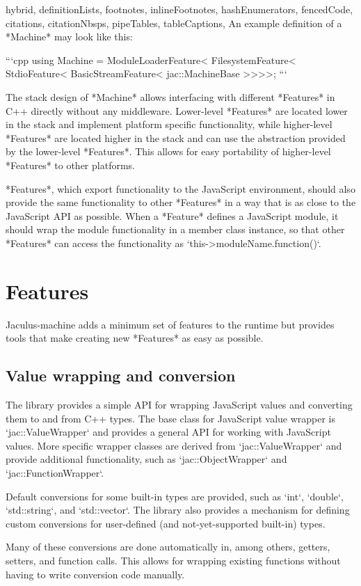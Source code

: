 \documentclass[
  digital,
  oneside,
  nosansbold,
  nocolorbold,
  lof,
  lot
]{fithesis4}
\begin{document}
\begin{markdown*}{%
  hybrid,
  definitionLists,
  footnotes,
  inlineFootnotes,
  hashEnumerators,
  fencedCode,
  citations,
  citationNbsps,
  pipeTables,
  tableCaptions,
}
An example definition of a *Machine* may look like this:

```cpp
using Machine =
    ModuleLoaderFeature<
    FilesystemFeature<
    StdioFeature<
    BasicStreamFeature<
    jac::MachineBase
>>>>;
```

The stack design of *Machine* allows interfacing with different *Features* in C++ directly without any middleware. Lower-level *Features* are located lower in the stack and implement platform specific functionality, while higher-level *Features* are located higher in the stack and can use the abstraction provided by the lower-level *Features*. This allows for easy portability of higher-level *Features* to other platforms.

*Features*, which export functionality to the JavaScript environment, should also provide the same functionality to other *Features* in a way that is as close to the JavaScript API as possible. When a *Feature* defines a JavaScript module, it should wrap the module functionality in a member class instance, so that other *Features* can access the functionality as `this->moduleName.function()`.


\section{Features}

Jaculus-machine adds a minimum set of features to the runtime but provides tools that make creating new *Features* as easy as possible.

\subsection{Value wrapping and conversion}

The library provides a simple API for wrapping JavaScript values and converting them to and from C++ types. The base class for JavaScript value wrapper is `jac::ValueWrapper` and provides a general API for working with JavaScript values. More specific wrapper classes are derived from `jac::ValueWrapper` and provide additional functionality, such as `jac::ObjectWrapper` and `jac::FunctionWrapper`.

Default conversions for some built-in types are provided, such as `int`, `double`, `std::string`, and `std::vector`. The library also provides a mechanism for defining custom conversions for user-defined (and not-yet-supported built-in) types.

Many of these conversions are done automatically in, among others, getters, setters, and function calls. This allows for wrapping existing functions without having to write conversion code manually.


\end{markdown*}
\end{document}
